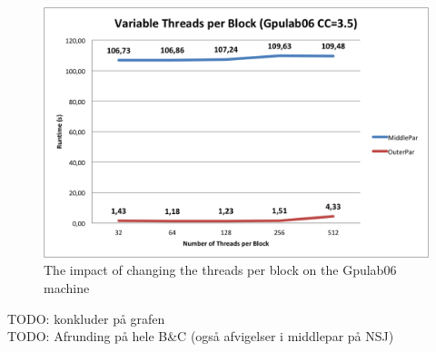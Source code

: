 \begin{figure}
\begin{center}
	\includegraphics[width=\textwidth]{img/Gpulab-tpb.png}
\end{center}
\caption{The impact of changing the threads per block on the Gpulab06 machine}
\end{figure}
TODO: konkluder på grafen \\

TODO:
Afrunding på hele B\&C (også afvigelser i middlepar på NSJ)
